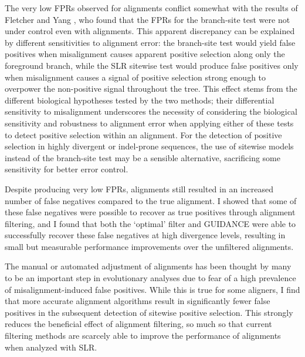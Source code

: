 The very low FPRs observed for \prankc alignments conflict somewhat
with the results of Fletcher and Yang
\citeyearpar{Fletcher2010}, who found that the FPRs for the
branch-site test were not under control even with \prankc
alignments. This apparent discrepancy can be explained by different
sensitivities to alignment error: the branch-site test would yield
false positives when misalignment causes apparent positive selection
along only the foreground branch, while the SLR sitewise test would
produce false positives only when misalignment causes a signal of
positive selection strong enough to overpower the non-positive signal
throughout the tree. This effect stems from the different biological
hypotheses tested by the two methods; their differential sensitivity
to misalignment underscores the necessity of considering the
biological sensitivity and robustness to alignment error when applying
either of these tests to detect positive selection within an
alignment. For the detection of positive selection in highly
  divergent or indel-prone sequences, the use of sitewise models
  instead of the branch-site test may be a sensible alternative,
  sacrificing some sensitivity for better error control.

Despite producing very low FPRs, \prankc alignments still resulted in
an increased number of false negatives compared to the true
alignment. I showed that some of these false negatives were possible
to recover as true positives through alignment filtering, and I found
that both the `optimal' filter and GUIDANCE were able to successfully
recover these false negatives at high divergence levels, resulting in
small but measurable performance improvements over the unfiltered
\prankc alignments.

The manual or automated adjustment of alignments has been thought by
many to be an important step in evolutionary analyses due to fear of a
high prevalence of misalignment-induced false positives. While this is
true for some aligners, I find that more accurate alignment
algorithms result in significantly fewer false positives in the
subsequent detection of sitewise positive selection. This strongly
reduces the beneficial effect of alignment filtering, so much so that
current filtering methods are scarcely able to improve the
performance of \prankc alignments when analyzed with SLR.

